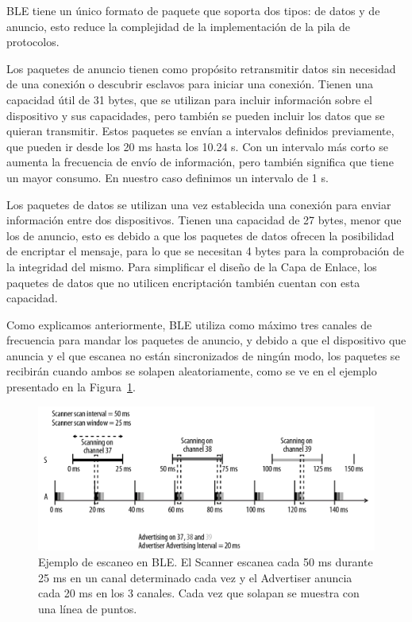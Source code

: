 BLE tiene un único formato de paquete que soporta dos tipos: de datos y de anuncio, esto reduce la complejidad de la implementación de la pila de protocolos.

Los paquetes de anuncio tienen como propósito retransmitir datos sin necesidad de una conexión o descubrir esclavos para iniciar una conexión. Tienen una capacidad útil de 31 bytes, que se utilizan para incluir información sobre el dispositivo y sus capacidades, pero también se pueden incluir los datos que se quieran transmitir. Estos paquetes se envían a intervalos definidos previamente, que pueden ir desde los 20 ms hasta los 10.24 s. Con un intervalo más corto se aumenta la frecuencia de envío de información, pero también significa que tiene un mayor consumo. En nuestro caso definimos un intervalo de 1 s.

Los paquetes de datos se utilizan una vez establecida una conexión para enviar información entre dos dispositivos. Tienen una capacidad de 27 bytes, menor que los de anuncio, esto es debido a que los paquetes de datos ofrecen la posibilidad de encriptar el mensaje, para lo que se necesitan 4 bytes para la comprobación de la integridad del mismo. Para simplificar el diseño de la Capa de Enlace, los paquetes de datos que no utilicen encriptación también cuentan con esta capacidad.

Como explicamos anteriormente, BLE utiliza como máximo tres canales de frecuencia para mandar los paquetes de anuncio, y debido a que el dispositivo que anuncia y el que escanea no están sincronizados de ningún modo, los paquetes se recibirán cuando ambos se solapen aleatoriamente, como se ve en el ejemplo presentado en la Figura~\ref{figuraBLEScan}.

\begin{figure}[h]%
	\centering
    \includegraphics[width=\linewidth]{figures/ble_scan_example.png} %
    \caption[Ejemplo de escaneo BLE]{Ejemplo de escaneo en BLE. El Scanner escanea cada 50 ms durante 25 ms en un canal determinado cada vez y el Advertiser anuncia cada 20 ms en los 3 canales. Cada vez que solapan se muestra con una línea de puntos.}
   	\label{figuraBLEScan}
\end{figure}

